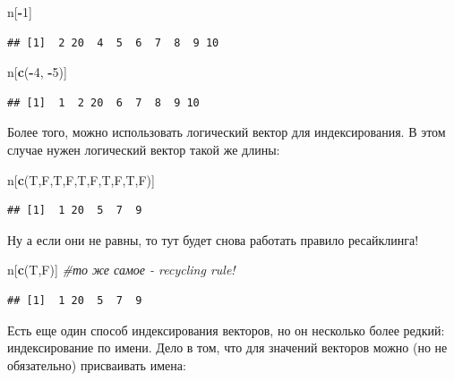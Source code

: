 \documentclass[]{book}
\newenvironment{Shaded}{\begin{snugshade}}{\end{snugshade}}
\newcommand{\KeywordTok}[1]{\textcolor[rgb]{0.13,0.29,0.53}{\textbf{#1}}}
\newcommand{\DecValTok}[1]{\textcolor[rgb]{0.00,0.00,0.81}{#1}}
\newcommand{\CommentTok}[1]{\textcolor[rgb]{0.56,0.35,0.01}{\textit{#1}}}
\newcommand{\OperatorTok}[1]{\textcolor[rgb]{0.81,0.36,0.00}{\textbf{#1}}}
\newcommand{\NormalTok}[1]{#1}
\begin{document}
\begin{Shaded}
\begin{Highlighting}[]
\NormalTok{n[}\OperatorTok{-}\DecValTok{1}\NormalTok{]}
\end{Highlighting}
\end{Shaded}

\begin{verbatim}
## [1]  2 20  4  5  6  7  8  9 10
\end{verbatim}

\begin{Shaded}
\begin{Highlighting}[]
\NormalTok{n[}\KeywordTok{c}\NormalTok{(}\OperatorTok{-}\DecValTok{4}\NormalTok{, }\OperatorTok{-}\DecValTok{5}\NormalTok{)]}
\end{Highlighting}
\end{Shaded}

\begin{verbatim}
## [1]  1  2 20  6  7  8  9 10
\end{verbatim}

Более того, можно использовать логический вектор для индексирования. В
этом случае нужен логический вектор такой же длины:

\begin{Shaded}
\begin{Highlighting}[]
\NormalTok{n[}\KeywordTok{c}\NormalTok{(T,F,T,F,T,F,T,F,T,F)]}
\end{Highlighting}
\end{Shaded}

\begin{verbatim}
## [1]  1 20  5  7  9
\end{verbatim}

Ну а если они не равны, то тут будет снова работать правило ресайклинга!

\begin{Shaded}
\begin{Highlighting}[]
\NormalTok{n[}\KeywordTok{c}\NormalTok{(T,F)] }\CommentTok{#то же самое - recycling rule!}
\end{Highlighting}
\end{Shaded}

\begin{verbatim}
## [1]  1 20  5  7  9
\end{verbatim}

Есть еще один способ индексирования векторов, но он несколько более
редкий: индексирование по имени. Дело в том, что для значений векторов
можно (но не обязательно) присваивать имена:
\end{document}
